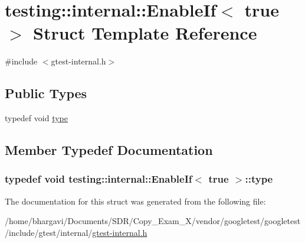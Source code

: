 \hypertarget{structtesting_1_1internal_1_1_enable_if_3_01true_01_4}{}\section{testing\+:\+:internal\+:\+:Enable\+If$<$ true $>$ Struct Template Reference}
\label{structtesting_1_1internal_1_1_enable_if_3_01true_01_4}


{\ttfamily \#include $<$gtest-\/internal.\+h$>$}

\subsection*{Public Types}
\begin{DoxyCompactItemize}
\item 
typedef void \hyperlink{structtesting_1_1internal_1_1_enable_if_3_01true_01_4_a9398d803f1fdd99ff41823746f6299ff}{type}
\end{DoxyCompactItemize}


\subsection{Member Typedef Documentation}
\subsubsection[{\texorpdfstring{type}{type}}]{\setlength{\rightskip}{0pt plus 5cm}typedef void {\bf testing\+::internal\+::\+Enable\+If}$<$ true $>$\+::{\bf type}}\hypertarget{structtesting_1_1internal_1_1_enable_if_3_01true_01_4_a9398d803f1fdd99ff41823746f6299ff}{}\label{structtesting_1_1internal_1_1_enable_if_3_01true_01_4_a9398d803f1fdd99ff41823746f6299ff}


The documentation for this struct was generated from the following file\+:\begin{DoxyCompactItemize}
\item 
/home/bhargavi/\+Documents/\+S\+D\+R/\+Copy\+\_\+\+Exam\+\_\+X/vendor/googletest/googletest/include/gtest/internal/\hyperlink{gtest-internal_8h}{gtest-\/internal.\+h}\end{DoxyCompactItemize}
